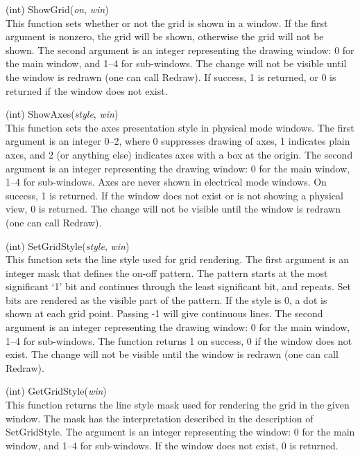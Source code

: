 \begin{description}
\item{(int) \vt ShowGrid({\it on\/}, {\it win\/})}\\
This function sets whether or not the grid is shown in a window.  If
the first argument is nonzero, the grid will be shown, otherwise the
grid will not be shown.  The second argument is an integer
representing the drawing window:  0 for the main window, and 1--4 for
sub-windows.  The change will not be visible until the window is
redrawn (one can call {\vt Redraw}).  If success, 1 is returned, or 0
is returned if the window does not exist.

\item{(int) \vt ShowAxes({\it style\/}, {\it win\/})}\\
This function sets the axes presentation style in physical mode
windows.  The first argument is an integer 0--2, where 0 suppresses
drawing of axes, 1 indicates plain axes, and 2 (or anything else)
indicates axes with a box at the origin.  The second argument is an
integer representing the drawing window:  0 for the main window, 1--4
for sub-windows.  Axes are never shown in electrical mode windows.  On
success, 1 is returned.  If the window does not exist or is not
showing a physical view, 0 is returned.  The change will not be
visible until the window is redrawn (one can call {\vt Redraw}).

\item{(int) \vt SetGridStyle({\it style}, {\it win\/})}\\
This function sets the line style used for grid rendering.  The first
argument is an integer mask that defines the on-off pattern.  The
pattern starts at the most significant `1' bit and continues through
the least significant bit, and repeats.  Set bits are rendered as the
visible part of the pattern.  If the style is 0, a dot is shown at
each grid point.  Passing -1 will give continuous lines.  The second
argument is an integer representing the drawing window:  0 for the
main window, 1--4 for sub-windows.  The function returns 1 on success, 0
if the window does not exist.  The change will not be visible until
the window is redrawn (one can call {\vt Redraw}).

\item{(int) \vt GetGridStyle({\it win\/})}\\
This function returns the line style mask used for rendering the grid
in the given window.  The mask has the interpretation described in the
description of {\vt SetGridStyle}.  The argument is an integer
representing the window:  0 for the main window, and 1--4 for
sub-windows.  If the window does not exist, 0 is returned.


\end{description}
